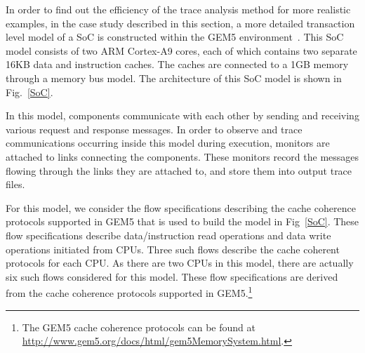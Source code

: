 \documentclass[conference]{IEEEtran}
\begin{document}
In order to find out the efficiency of the trace analysis
method for more realistic examples, in the case study
described in this section, a more detailed transaction level
model of a SoC is constructed within the GEM5
environment~\cite{Binkert2011}.  This SoC model consists of
two ARM Cortex-A9 cores, each of which contains two separate
16KB data and instruction caches.  The caches are connected
to a 1GB memory through a memory bus model.  The
architecture of this SoC model is shown in Fig.~\ref{SoC}.

In this model, components communicate with each other by
sending and receiving various request and response messages.
In order to observe and trace communications occurring
inside this model during execution, monitors are attached to
links connecting the components. These monitors record the
messages flowing through the links they are attached to, and
store them into output trace files.




For this model, we consider the flow specifications
describing the cache coherence protocols supported in GEM5
that is used to build the model in Fig~\ref{SoC}.  These
flow specifications describe data/instruction read
operations and data write operations initiated from CPUs.
Three such flows describe the cache coherent protocols for
each CPU.  As there are two CPUs in this model, there are
actually six such flows considered for this model.  These
flow specifications are derived from the cache coherence
protocols supported in GEM5.\footnote{The GEM5 cache
  coherence protocols can be found at
  \url{http://www.gem5.org/docs/html/gem5MemorySystem.html}.}
\end{document}
